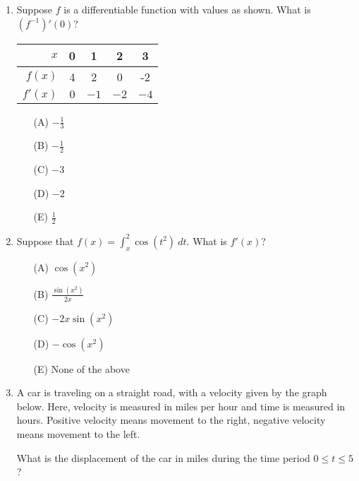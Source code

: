 \documentclass[12pt]{article}
\begin{document}
\begin{enumerate}
\item Suppose $f$ is a differentiable function with values as shown. What is $\displaystyle (f^{-1})'(0)$?  

\begin{multicols}{2}
	\begin{tabular}{r|c|c|c|c}
	$x$ & 0 & 1 & 2 & 3 \\
	\hline
	$f(x)$ & 4 & 2 & 0 & -2 \\
	\hline
	$f'(x)$ & $0$ & $-1$ & $-2$ & $-4$ 
	\end{tabular}
	\columnbreak
	\begin{enumerate}\setlength{\itemsep}{.4 cm}
	\item[(A)] $-\frac13$
	\item[(B)] $-\frac12$
	\item[(C)] $-3$
	\item[(D)] $-2$
	\item[(E)] $\frac12$
	\end{enumerate}
\end{multicols}

\vspace{0.1cm}


\item Suppose that $f(x) = \displaystyle \int_{x}^{2} \cos(t^2) \ dt$.  What is $f'(x)$?

\begin{enumerate}
\item[(A)] $\cos(x^2)$
\item[(B)] $\displaystyle \frac{\sin (x^2)}{2x}$
\item[(C)] $-2x\sin(x^2)$
\item[(D)] $-\cos (x^2)$
\item[(E)] None of the above
\end{enumerate}


\item A car is traveling on a straight road, with a velocity given by the graph below.  Here, velocity is measured in miles per hour and time is measured in hours.  Positive velocity means movement to the right, negative velocity means movement to the left.

What is the displacement of the car in miles during the time period $0 \leq t \leq 5$ ?



\begin{center}
\end{center}
\end{enumerate}
\end{document}
